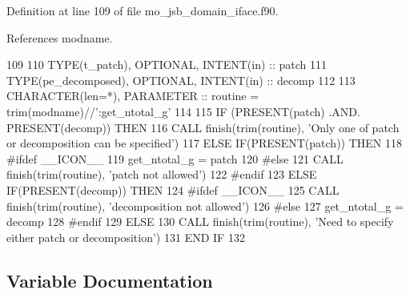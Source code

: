 Definition at line 109 of file mo\+\_\+jsb\+\_\+domain\+\_\+iface.\+f90.



References modname.


\begin{DoxyCode}
109 
110     \textcolor{keywordtype}{TYPE}(t\_patch),       \textcolor{keywordtype}{OPTIONAL}, \textcolor{keywordtype}{INTENT(in)} :: patch
111     \textcolor{keywordtype}{TYPE}(pe\_decomposed), \textcolor{keywordtype}{OPTIONAL}, \textcolor{keywordtype}{INTENT(in)} :: decomp
112 
113     \textcolor{keywordtype}{CHARACTER(len=*)}, \textcolor{keywordtype}{PARAMETER} :: routine = trim(modname)//\textcolor{stringliteral}{':get\_ntotal\_g'}
114 
115     \textcolor{keywordflow}{IF} (\textcolor{keyword}{PRESENT}(patch) .AND. \textcolor{keyword}{PRESENT}(decomp)) \textcolor{keywordflow}{THEN}
116       \textcolor{keyword}{CALL }finish(trim(routine), \textcolor{stringliteral}{'Only one of patch or decomposition can be specified'})
117     \textcolor{keywordflow}{ELSE} \textcolor{keywordflow}{IF}(\textcolor{keyword}{PRESENT}(patch)) \textcolor{keywordflow}{THEN}
118 \textcolor{preprocessor}{#ifdef \_\_ICON\_\_}
119 \textcolor{preprocessor}{}      get\_ntotal\_g = patch%
120 \textcolor{preprocessor}{#else}
121 \textcolor{preprocessor}{}      \textcolor{keyword}{CALL }finish(trim(routine), \textcolor{stringliteral}{'patch not allowed'})
122 \textcolor{preprocessor}{#endif}
123 \textcolor{preprocessor}{}    \textcolor{keywordflow}{ELSE} \textcolor{keywordflow}{IF}(\textcolor{keyword}{PRESENT}(decomp)) \textcolor{keywordflow}{THEN}
124 \textcolor{preprocessor}{#ifdef \_\_ICON\_\_}
125 \textcolor{preprocessor}{}      \textcolor{keyword}{CALL }finish(trim(routine), \textcolor{stringliteral}{'decomposition not allowed'})
126 \textcolor{preprocessor}{#else}
127 \textcolor{preprocessor}{}      get\_ntotal\_g = decomp%
128 \textcolor{preprocessor}{#endif}
129 \textcolor{preprocessor}{}    \textcolor{keywordflow}{ELSE}
130       \textcolor{keyword}{CALL }finish(trim(routine), \textcolor{stringliteral}{'Need to specify either patch or decomposition'})
131 \textcolor{keywordflow}{    END IF}
132 
\end{DoxyCode}


\subsection{Variable Documentation}
\hypertarget{namespacemo__jsb__domain__iface_af4a20b2bcbe28bcb3a12e209c85fa762}{}
